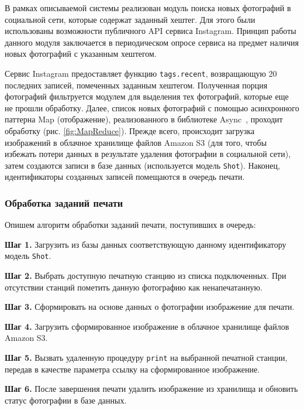 \documentclass[a4paper,14pt,href,draft]{article}
\begin{document}
В рамках описываемой системы реализован модуль поиска новых фотографий в социальной сети, которые содержат заданный
хештег. Для этого были использованы возможности публичного API сервиса Instagram. Принцип работы данного модуля заключается
в периодическом опросе сервиса на предмет наличия новых фотографий с указанным хештегом.

Сервис Instagram предоставляет функцию \texttt{tags.recent}, возвращающую 20 последних записей, помеченных заданным
хештегом. Полученная порция фотографий фильтруется модулем для выделения тех фотографий, которые еще не прошли обработку.
Далее, список новых фотографий с помощью асинхронного паттерна Map (отображение), реализованного в библиотеке
Async~\cite{Async}, проходит обработку (рис. \ref{fig:MapReduce}). Прежде всего, происходит загрузка изображений в
облачное хранилище файлов Amazon S3 (для того, чтобы избежать потери данных в результате удаления фотографии в социальной сети),
затем создаются записи в базе данных (используется модель \texttt{Shot}). Наконец, идентификаторы созданных записей помещаются
в очередь печати.

\subsubsection{Обработка заданий печати}
Опишем алгоритм обработки заданий печати, поступивших в очередь:
\begin{description}
  \item \textbf{Шаг 1.} Загрузить из базы данных соответствующую данному идентификатору модель \texttt{Shot}.
  \item \textbf{Шаг 2.} Выбрать доступную печатную станцию из списка подключенных. При отсутствии станций пометить
    данную фотографию как ненапечатанную.
  \item \textbf{Шаг 3.} Сформировать на основе данных о фотографии изображение для печати.
  \item \textbf{Шаг 4.} Загрузить сформированное изображение в облачное хранилище файлов Amazon S3.
  \item \textbf{Шаг 5.} Вызвать удаленную процедуру \texttt{print} на выбранной печатной станции, передав в качестве
    параметра ссылку на сформированное изображение.
  \item \textbf{Шаг 6.} После завершения печати удалить изображение из хранилища и обновить статус фотографии в базе
    данных.
\end{description}
\end{document}
